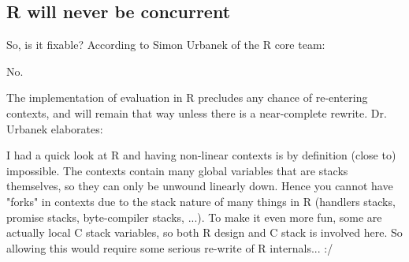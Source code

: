 \subsection{R will never be concurrent}\label{sec:no}

So, is it fixable?
According to Simon Urbanek of the R core team:

\begin{displayquote}
No.
\end{displayquote}

The implementation of evaluation in R precludes any chance of re-entering contexts, and will remain that way unless there is a near-complete rewrite. Dr. Urbanek elaborates:

\begin{displayquote}
I had a quick look at R and having non-linear contexts is by definition (close to) impossible. The contexts contain many global variables that are stacks themselves, so they can only be unwound linearly down. Hence you cannot have "forks" in contexts due to the stack nature of many things in R (handlers stacks, promise stacks, byte-compiler stacks, ...). To make it even more fun, some are actually local C stack variables, so both R design and C stack is involved here. So allowing this would require some serious re-write of R internals... :/
\end{displayquote}
